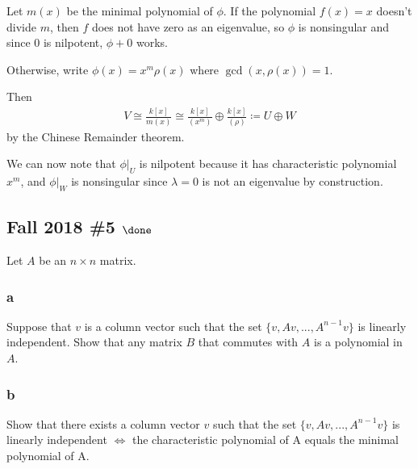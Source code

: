 
\begin{solution}

Let \(m(x)\) be the minimal polynomial of \(\phi\). If the polynomial
\(f(x) = x\) doesn't divide \(m\), then \(f\) does not have zero as an
eigenvalue, so \(\phi\) is nonsingular and since \(0\) is nilpotent,
\(\phi + 0\) works.

Otherwise, write \(\phi(x) = x^m \rho(x)\) where
\(\gcd(x, \rho(x)) = 1\).

Then
\begin{align*}
V \cong \frac{k[x]}{m(x)} \cong \frac{k[x]}{(x^m)} \oplus \frac{k[x]}{(\rho)}
\coloneqq U \oplus W
\end{align*}
by the Chinese Remainder theorem.

We can now note that \({\left.{{\phi}} \right|_{{U}} }\) is nilpotent
because it has characteristic polynomial \(x^m\), and
\({\left.{{\phi}} \right|_{{W}} }\) is nonsingular since \(\lambda = 0\)
is not an eigenvalue by construction.

\end{solution}

\hypertarget{fall-2018-5-done}{%
\subsection{\texorpdfstring{Fall 2018 \#5
\(\done\)}{Fall 2018 \#5 \textbackslash done}}\label{fall-2018-5-done}}

Let \(A\) be an \(n \times n\) matrix.

\hypertarget{a-101}{%
\subsubsection{a}\label{a-101}}

Suppose that \(v\) is a column vector such that the set
\(\{v, Av, . . . , A^{n-1} v\}\) is linearly independent. Show that any
matrix \(B\) that commutes with \(A\) is a polynomial in \(A\).

\hypertarget{b-91}{%
\subsubsection{b}\label{b-91}}

Show that there exists a column vector \(v\) such that the set
\(\{v, Av, . . . , A^{n-1} v\}\) is linearly independent \(\iff\) the
characteristic polynomial of A equals the minimal polynomial of A.

